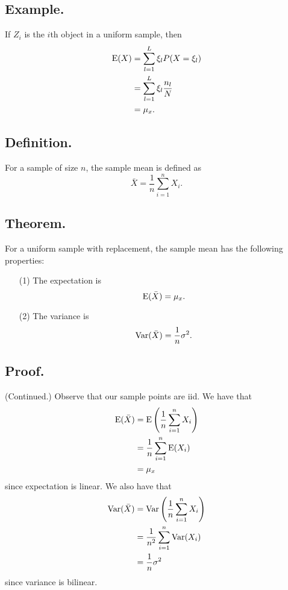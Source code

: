 \documentclass[titlepage]{article}
\begin{document}
\subsection{Example.} If $Z_{i}$ is the $i$th object in a uniform sample, then 
\begin{align*}
    \text{E}(X) &= \sum_{l=1}^{L}\xi_{l}P(X = \xi_{l}) \\
           &= \sum_{l=1}^{L}\xi_{l}\frac{n_{l}}{N} \\
           &= \mu_{x}.
\end{align*}

\subsection{Definition.} For a sample of size $n$, the sample mean is defined as 
$$\bar{X} = \frac{1}{n}\sum_{i=1}^{n}X_{i}.$$

\subsection{Theorem.} For a uniform sample with replacement, the sample mean has the following properties:
\begin{enumerate}
\item[(1)] The expectation is 
$$\text{E}(\bar{X}) = \mu_{x}.$$
\item[(2)] The variance is
$$\text{Var}(\bar{X}) = \frac{1}{n}\sigma^{2}.$$
\end{enumerate}

\subsection{Proof.} (Continued.) Observe that our sample points are iid. We have that 
\begin{align*}
    \text{E}(\bar{X}) &= \text{E}\left(\frac{1}{n}\sum_{i=1}^{n}X_{i}\right) \\
                &= \frac{1}{n}\sum_{i=1}^{n}\text{E}(X_{i}) \\
                &= \mu_{x}
\end{align*}
since expectation is linear. We also have that 
\begin{align*}
    \text{Var}(\bar{X}) &= \text{Var}\left(\frac{1}{n}\sum_{i=1}^{n}X_{i}\right) \\
                  &= \frac{1}{n^{2}}\sum_{i=1}^{n}\text{Var}(X_{i}) \\
                  &= \frac{1}{n}\sigma^{2}
\end{align*}
since variance is bilinear.
\end{document}
